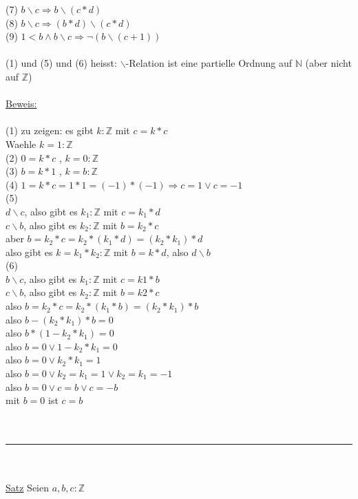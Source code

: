 \documentclass[18pt,a4paper]{article}
\newcommand{\tab}{\hspace*{2em}}
\begin{document}
(7) $b\backslash c \Rightarrow b\backslash (c*d)$\\
(8) $b\backslash c \Rightarrow (b*d)\backslash (c*d)$\\
(9) $1<b \wedge b\backslash c \Rightarrow \neg (b\backslash(c+1))$\\
\\
(1) und (5) und (6) heisst: $\backslash$-Relation ist eine partielle Ordnung auf $\mathbb{N}$ (aber nicht auf $\mathbb{Z}$)\\
\\
\uline{Beweis:}\\
\\
(1) zu zeigen: es gibt $k : \mathbb{Z}$ mit $c = k*c$\\
\tab Waehle $k=1 : \mathbb{Z}$\\
(2) $0 = k*c$ , $ k=0 : \mathbb{Z}$\\
(3) $b = k*1$ , $ k=b : \mathbb{Z}$\\
(4) $1 = k*c = 1*1 = (-1)*(-1) \Rightarrow c=1 \vee c=-1$\\
(5)\\ 
$d\backslash c$, also gibt es $k_1 : \mathbb{Z}$ mit $c = k_1 * d$\\
$c\backslash b$, also gibt es $k_2 : \mathbb{Z}$ mit $b = k_2 * c$\\
aber $b=k_2 *c = k_2*(k_1*d) = (k_2 * k_1) *d$\\
also gibt es $k=k_1*k_2: \mathbb{Z}$ mit $b=k*d$, also $d\backslash b$\\
(6)\\
$b\backslash c$, also gibt es $k_1 : \mathbb{Z}$ mit $c = k1 * b$\\
$c\backslash b$, also gibt es $k_2 : \mathbb{Z}$ mit $b = k2 * c$\\
also $b = k_2 * c = k_2*(k_1*b) = (k_2*k_1)*b$\\
also $b- (k_2*k_1)*b =0$\\
also $b* (1- k_2*k_1) =0$\\
also $b=0 \vee 1- k_2*k_1 =0$\\
also $b=0 \vee k_2 * k_1 = 1$\\
also $b=0 \vee k_2 = k_1 = 1 \vee k_2 = k_1 = -1$\\
also $b=0 \vee c = b \vee c =-b $\\
mit $b=0$ ist $c =b$\\
\\
\\
\rule{\textwidth}{0.4mm}\\
\\
\uline{Satz} Seien $a,b,c : \mathbb{Z}$ \\
\end{document}

